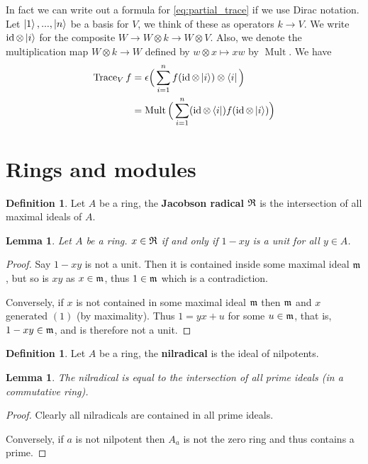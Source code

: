 \documentclass[12pt]{article}
\theoremstyle{plain}
\newtheorem{lemma}[thm]{Lemma}
\theoremstyle{definition}
\newtheorem{defn}[thm]{Definition} %
\newcommand{\lto}{\longrightarrow}
\begin{document}
In fact we can write out a formula for \eqref{eq:partial_trace} if we use Dirac notation. Let $\ket{1},...,\ket{n}$ be a basis for $V$, we think of these as operators $k \lto V$.  We write $\operatorname{id} \otimes \ket{i}$ for the composite $W \lto W \otimes k \lto W \otimes V$.  Also, we denote the multiplication map $W \otimes k \lto W$ defined by $w \otimes x \longmapsto xw$ by $\operatorname{Mult}$. We have
\begin{align*}
\operatorname{Trace}_V f &= \epsilon\Big(\sum_{i = 1}^n f(\operatorname{id} \otimes \ket{i}) \otimes \bra{i}\Big)\\
&= \operatorname{Mult}\Big(\sum_{i = 1}^n (\operatorname{id} \otimes \bra{i})f (\operatorname{id} \otimes \ket{i})\Big)
\end{align*}


\section{Rings and modules}
\begin{defn}
Let $A$ be a ring, the \textbf{Jacobson radical} $\frak{R}$ is the intersection of all maximal ideals of $A$.
\end{defn}
\begin{lemma}
Let $A$ be a ring. $x \in \frak{R}$ if and only if $1 - xy$ is a unit for all $y \in A$.
\end{lemma}
\begin{proof}
Say $1 - xy$ is not a unit. Then it is contained inside some maximal ideal $\frak{m}$, but so is $xy$ as $x \in \frak{m}$, thus $1 \in \frak{m}$ which is a contradiction.

Conversely, if $x$ is not contained in some maximal ideal $\frak{m}$ then $\frak{m}$ and $x$ generated $(1)$ (by maximality). Thus $1 = yx + u$ for some $u \in \frak{m}$, that is, $1 - xy \in \frak{m}$, and is therefore not a unit.
\end{proof}
\begin{defn}
\label{def:nilradical_one}
Let $A$ be a ring, the \textbf{nilradical} is the ideal of nilpotents.
\end{defn}
\begin{lemma}
\label{lem:intersection_primes}
The nilradical is equal to the intersection of all prime ideals (in a commutative ring).
\end{lemma}
\begin{proof}
Clearly all nilradicals are contained in all prime ideals.

Conversely, if $a$ is not nilpotent then $A_{a}$ is not the zero ring and thus contains a prime.
\end{proof}
\end{document}
